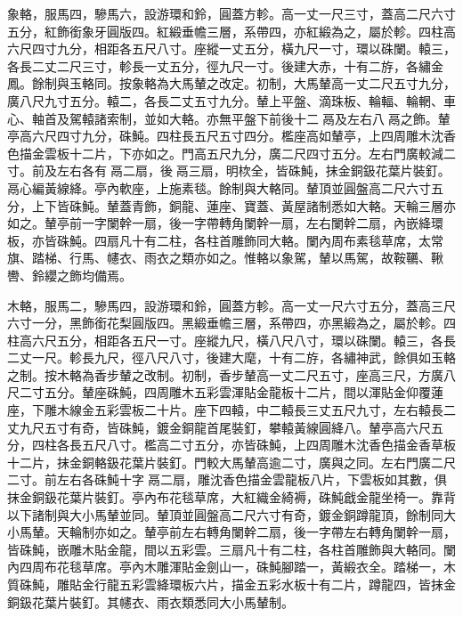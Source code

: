 \begin{pinyinscope}
象輅，服馬四，驂馬六，設游環和鈴，圓蓋方軫。高一丈一尺三寸，蓋高二尺六寸五分，紅飾銜象牙圓版四。紅緞垂幨三層，系帶四，亦紅緞為之，屬於軫。四柱高六尺四寸九分，相距各五尺八寸。座縱一丈五分，橫九尺一寸，環以硃闌。轅三，各長二丈二尺三寸，軫長一丈五分，徑九尺一寸。後建大赤，十有二斿，各繡金鳳。餘制與玉輅同。按象輅為大馬輦之改定。初制，大馬輦高一丈二尺五寸九分，廣八尺九寸五分。轅二，各長二丈五寸九分。輦上平盤、滴珠板、輪輻、輪輞、車心、軸首及駕轅諸索制，並如大輅。亦無平盤下前後十二鬲及左右八鬲之飾。輦亭高六尺四寸九分，硃魨。四柱長五尺五寸四分。檻座高如輦亭，上四周雕木沈香色描金雲板十二片，下亦如之。門高五尺九分，廣二尺四寸五分。左右門廣較減二寸。前及左右各有鬲二扇，後鬲三扇，明栨全，皆硃魨，抹金銅鈒花葉片裝釘。鬲心編黃線絳。亭內軟座，上施素毯。餘制與大輅同。輦頂並圓盤高二尺六寸五分，上下皆硃魨。輦蓋青飾，銅龍、蓮座、寶蓋、黃屋諸制悉如大輅。天輪三層亦如之。輦亭前一字闌幹一扇，後一字帶轉角闌幹一扇，左右闌幹二扇，內嵌絳環板，亦皆硃魨。四扇凡十有二柱，各柱首雕飾同大輅。闌內周布素毯草席，太常旗、踏梯、行馬、幰衣、雨衣之類亦如之。惟輅以象駕，輦以馬駕，故鞍韉、鞦轡、鈴纓之飾均備焉。

木輅，服馬二，驂馬四，設游環和鈴，圓蓋方軫。高一丈一尺六寸五分，蓋高三尺六寸一分，黑飾銜花梨圓版四。黑緞垂幨三層，系帶四，亦黑緞為之，屬於軫。四柱高六尺五分，相距各五尺一寸。座縱九尺，橫八尺八寸，環以硃闌。轅三，各長二丈一尺。軫長九尺，徑八尺八寸，後建大麾，十有二斿，各繡神武，餘俱如玉輅之制。按木輅為香步輦之改制。初制，香步輦高一丈二尺五寸，座高三尺，方廣八尺二寸五分。輦座硃魨，四周雕木五彩雲渾貼金龍板十二片，間以渾貼金仰覆蓮座，下雕木線金五彩雲板二十片。座下四轅，中二轅長三丈五尺九寸，左右轅長二丈九尺五寸有奇，皆硃魨，鍍金銅龍首尾裝釘，攀轅黃線圓絳八。輦亭高六尺五分，四柱各長五尺八寸。檻高二寸五分，亦皆硃魨，上四周雕木沈香色描金香草板十二片，抹金銅輅鈒花葉片裝釘。門較大馬輦高逾二寸，廣與之同。左右門廣二尺二寸。前左右各硃魨十字鬲二扇，雕沈香色描金雲龍板八片，下雲板如其數，俱抹金銅鈒花葉片裝釘。亭內布花毯草席，大紅織金綺褥，硃魨戧金龍坐椅一。靠背以下諸制與大小馬輦並同。輦頂並圓盤高二尺六寸有奇，鍍金銅蹲龍頂，餘制同大小馬輦。天輪制亦如之。輦亭前左右轉角闌幹二扇，後一字帶左右轉角闌幹一扇，皆硃魨，嵌雕木貼金龍，間以五彩雲。三扇凡十有二柱，各柱首雕飾與大輅同。闌內四周布花毯草席。亭內木雕渾貼金劍山一，硃魨腳踏一，黃緞衣全。踏梯一，木質硃魨，雕貼金行龍五彩雲絳環板六片，描金五彩水板十有二片，蹲龍四，皆抹金銅鈒花葉片裝釘。其幰衣、雨衣類悉同大小馬輦制。


\end{pinyinscope}
